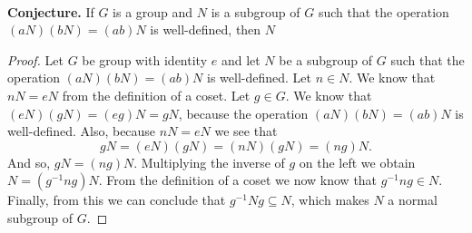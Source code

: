 \documentclass[11pt]{article}
\begin{document}
~\\
{\bf Conjecture.} If $G$ is a group and $N$ is a subgroup of $G$ such that the operation $(aN)(bN) = (ab)N$ is well-defined, then $N$
\begin{proof}
Let $G$ be group with identity $e$ and let $N$ be a subgroup of $G$ such that the operation $(aN)(bN) = (ab)N$ is well-defined. Let $n\in N$. We know that $nN = eN$ from the definition of a coset. Let $g\in G$. We know that $(eN)(gN) = (eg)N = gN$, because the operation $(aN)(bN) = (ab)N$ is well-defined. Also, because $nN = eN$ we see that 
\[gN = (eN)(gN) = (nN)(gN) = (ng)N.\]
And so, $gN = (ng)N$. Multiplying the inverse of $g$ on the left we obtain $N = (g^{-1}ng)N$. From the definition of a coset we now know that $g^{-1}ng \in N$. Finally, from this we can conclude that $g^{-1}Ng \subseteq N$, which makes $N$ a normal subgroup of $G$.
\end{proof}
\end{document}
